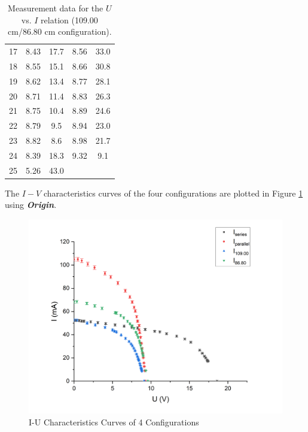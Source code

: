 \documentclass{article}
\begin{document}
{\begin{table}[H]
\begin{tabular}{@{}c|cc||cc@{}}
17                & 8.43              & 17.7      & 8.56                 & 33.0                 \\
18                & 8.55              & 15.1      & 8.66                 & 30.8                 \\
19                & 8.62              & 13.4      & 8.77                 & 28.1                 \\
20                & 8.71              & 11.4      & 8.83                 & 26.3                 \\
21                & 8.75              & 10.4      & 8.89                 & 24.6                 \\
22                & 8.79              & 9.5       & 8.94                 & 23.0                 \\
23                & 8.82              & 8.6       & 8.98                 & 21.7                 \\
24                & 8.39              & 18.3      & 9.32                 & 9.1                  \\
25                & 5.26              & 43.0      & \multicolumn{1}{l}{} & \multicolumn{1}{l}{}  \\ \bottomrule  
\end{tabular}\caption{Measurement data for the $U$ vs. $I$ relation (109.00 cm/86.80 cm configuration).} \label{tab.diff-dist}
\end{table}

The $I-V$ characteristics curves of the four configurations are plotted in Figure \ref{fig.I-U} using \textbf{\textit{Origin}}.

\begin{figure}[H]
\centering
\includegraphics[scale=0.6]{I-U plot}
\caption{I-U Characteristics Curves of 4 Configurations}\label{fig.I-U}
\end{figure}

}
\end{document}
